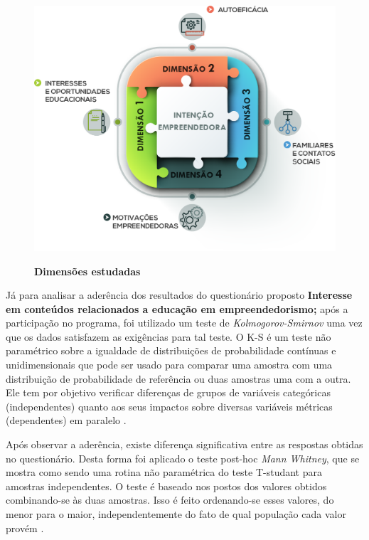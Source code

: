 \begin{figure}[H]
\centering
\caption{\textbf{Dimensões estudadas}}
\includegraphics[scale=0.35]{Imagens/dimencoes.png}
\label{figura_9}
\end{figure}



Já para analisar a aderência dos resultados do questionário proposto \textbf{Interesse em conteúdos relacionados a educação em empreendedorismo;} após a participação no programa, foi utilizado um teste de \textit{Kolmogorov-Smirnov} uma vez que os dados satisfazem as exigências para tal teste. O K-S é um teste não paramétrico sobre a igualdade de distribuições de probabilidade contínuas e unidimensionais que pode ser usado para comparar uma amostra com uma distribuição de probabilidade de referência ou duas amostras uma com a outra. Ele tem por objetivo verificar diferenças de grupos de variáveis categóricas (independentes) quanto aos seus impactos sobre diversas variáveis métricas (dependentes) em paralelo \cite{hair_alise_2009}. 

Após observar a aderência, existe diferença significativa entre as respostas obtidas no questionário. Desta forma foi aplicado o teste post-hoc \textit{Mann Whitney}, que se mostra como sendo uma rotina não paramétrica do teste T-studant para amostras independentes. O teste é baseado nos postos dos valores obtidos combinando-se às duas amostras. Isso é feito ordenando-se esses valores, do menor para o maior, independentemente do fato de qual população cada valor provém \cite{matsouaka_optimal_2018}.

